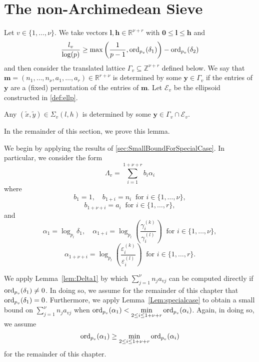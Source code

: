 \section{The non-Archimedean Sieve}
\label{sec:nonArchSieve}

Let $v \in \{1, \dots, \nu\}$. We take vectors $\mathbf{l},\mathbf{h} \in \mathbb{R}^{\nu+r}$ with $\mathbf{0} \leq \mathbf{l} \leq \mathbf{h}$ and 
\[\frac{l_v}{\log(p)} \geq \max\left( \frac{1}{p-1}, \operatorname{ord}_{p_v}(\delta_1)\right) - \operatorname{ord}_{p_v}(\delta_2)\]
and then consider the translated lattice $\Gamma_v \subseteq \mathbb{Z}^{\nu + r}$ defined below. We say that ${\mathbf{m} = (n_1, \dots, n_{\nu}, a_1, \dots, a_r) \in \mathbb{R}^{r + \nu}}$ is determined by some $\mathbf{y} \in \Gamma_v$ if the entries of $\mathbf{y}$ are a (fixed) permutation of the entries of $\mathbf{m}$. Let $\mathcal{E}_v$ be the ellipsoid constructed in \eqref{def:ellp}. 

\begin{lemma} \label{lem:mainnonarch}
Any $(\tilde{x},\tilde{y}) \in \Sigma_v(l,h)$ is determined by some $\mathbf{y} \in \Gamma_v \cap \mathcal{E}_v$. 
\end{lemma}

In the remainder of this section, we prove this lemma. 

We begin by applying the results of \autoref{sec:SmallBoundForSpecialCase}. In particular, we consider the form
\[\Lambda_v = \sum_{i = 1}^{1+\nu+r} b_i\alpha_i\]
where
\[b_1 = 1, \quad b_{1+i} = n_i \ \text{ for } i \in \{1, \dots, \nu\},\]
\[ b_{1 + \nu+i} = a_i \ \text{ for } i \in \{1, \dots, r\},\]
and
\[\alpha_1 = \log_{p_l} \delta_1, \quad \alpha_{1+i} = \log_{p_l}\left( \frac{\gamma_i^{(k)}}{\gamma_i^{(l)}}\right)  \ \text{ for } i \in \{1, \dots, \nu\},\]
\[\alpha_{1+ \nu+i} = \log_{p_l}\left( \frac{\varepsilon_i^{(k)}}{\varepsilon_i^{(l)}}\right)
\ \text{ for } i \in \{1, \dots, r\}.\]

We apply Lemma~\ref{lem:Delta1} by which $\sum_{j = 1}^{\nu} n_ja_{vj}$ can be computed directly if ${\operatorname{ord}_{p_v}(\delta_1) \neq 0}$. In doing so, we assume for the remainder of this chapter that $\operatorname{ord}_{p_v}(\delta_1) = 0$. Furthermore, we apply Lemma~\ref{Lem:specialcase} to obtain a small bound on $\sum_{j = 1}^{\nu} n_ja_{vj}$ when $\operatorname{ord}_{p_v}(\alpha_1) < \displaystyle \min_{2 \leq i \leq 1+\nu+r} \operatorname{ord}_{p_v}(\alpha_i)$. Again, in doing so, we assume 
\[\operatorname{ord}_{p_v}(\alpha_1) \geq \displaystyle \min_{2 \leq i \leq 1+\nu+r} \operatorname{ord}_{p_v}(\alpha_i)\]
for the remainder of this chapter. 

